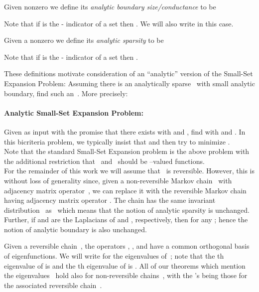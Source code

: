 \documentclass[11pt]{article}
\begin{document}
\begin{definition}
    Given nonzero  we define its \emph{analytic boundary size/conductance} to be
    
    Note that if  is the - indicator of a set  then .  We will also write  in this case.
\end{definition}

\begin{definition}
    Given a nonzero  we define its \emph{analytic sparsity} to be
    
    Note that if  is the - indicator of a set  then .
\end{definition}

These definitions motivate consideration of an ``analytic'' version of the Small-Set Expansion Problem: Assuming there is an analytically sparse~ with small analytic boundary, find such an~.  More precisely:

\paragraph{Analytic Small-Set Expansion Problem:} Given as input  with the promise that there exists  with  and , find  with  and .  In this bicriteria problem, we typically insist that  and then try to minimize . \\

\noindent Note that the standard Small-Set Expansion problem is the above problem with the additional restriction that~ and~ should be --valued functions.  \\

For the remainder of this work we will assume that~ is reversible.  However, this is without loss of generality since, given a non-reversible Markov chain~ with adjacency matrix operator~, we can replace it with the reversible Markov chain~ having adjacency matrix operator .  The chain  has the same invariant distribution~ as~ which means that the notion of analytic sparsity is unchanged.  Further, if  and  are the Laplacians of  and , respectively, then  for any ; hence the notion of analytic boundary is also unchanged.

Given a reversible chain~, the operators , , and  have a common orthogonal basis of eigenfunctions.  We will write  for the eigenvalues of~; note that the th eigenvalue of  is  and the th eigenvalue of  is .  All of our theorems which mention the eigenvalues~ hold also for non-reversible chains~, with the 's being those for the associated reversible chain~.
\end{document}
